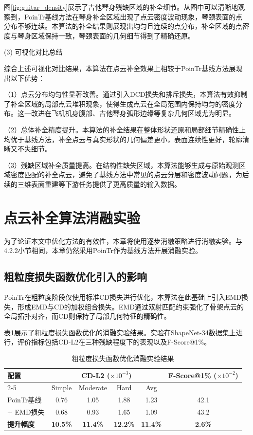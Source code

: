 图\ref{fig:guitar_density}展示了吉他琴身残缺区域的补全细节。从图中可以清晰地观察到，PoinTr基线方法在琴身补全区域出现了点云密度波动现象，琴颈表面的点分布不够连续。本算法的补全结果则展现出均匀且连续的点分布，补全区域的点密度与琴身区域保持一致，琴颈表面的几何细节得到了精确还原。

(3) 可视化对比总结

综合上述可视化对比结果，本算法在点云补全效果上相较于PoinTr基线方法展现出以下优势：

（1）点云分布均匀性显著改善。通过引入DCD损失和排斥损失，本算法有效抑制了补全区域的局部点云堆积现象，使得生成点云在全局范围内保持均匀的密度分布。这一改进在飞机机身腹部、吉他琴身弧形边缘等复杂几何区域尤为明显。

（2）总体补全精度提升。本算法的补全结果在整体形状还原和局部细节精确性上均优于基线方法，补全点云与真实形状的几何偏差更小，表面连续性更好，轮廓清晰又不失细节。

（3）残缺区域补全质量提高。在结构性缺失区域，本算法能够生成与原始观测区域密度匹配的补全点云，避免了基线方法中常见的点云分层和密度波动问题，为后续的三维表面重建等下游任务提供了更高质量的输入数据。

\section{点云补全算法消融实验}

为了论证本文中优化方法的有效性，本章将使用逐步消融策略进行消融实验。与4.2.2小节相同，本章仍然采用PoinTr\cite{yu2021pointr}作为基线方法开展消融实验。

\subsection{粗粒度损失函数优化引入的影响}

PoinTr在粗粒度阶段仅使用标准CD损失进行优化，本算法在此基础上引入EMD损失，形成EMD与CD的加权组合损失。EMD通过双射匹配约束强化了骨架点云的全局拓扑对齐，而CD则保持了局部几何特征的精确性。

表\ref{tab:ablation_coarse}展示了粗粒度损失函数优化的消融实验结果。实验在ShapeNet-34数据集上进行，评价指标包括CD-L2在三种残缺程度下的表现以及F-Score@1\%。
\FloatBarrier
\begin{table}[htbp]
\centering
\caption{粗粒度损失函数优化消融实验结果}
\label{tab:ablation_coarse}
\begin{tabular}{lccccc}
\toprule
\multirow{2}{*}{配置} & \multicolumn{4}{c}{CD-L2 ($\times 10^{-3}$)} & \multirow{2}{*}{F-Score@1\% ($\times 10^{-2}$)} \\
\cmidrule(lr){2-5}
& Simple & Moderate & Hard & Avg & \\
\midrule
PoinTr基线 & 0.76 & 1.05 & 1.88 & 1.23 & 42.1 \\
+ EMD损失 & 0.68 & 0.93 & 1.65 & 1.09 & 43.2 \\
\midrule
\textbf{提升幅度} & \textbf{10.5\%} & \textbf{11.4\%} & \textbf{12.2\%} & \textbf{11.4\%} & \textbf{2.6\%} \\
\bottomrule
\end{tabular}
\end{table}
\FloatBarrier

